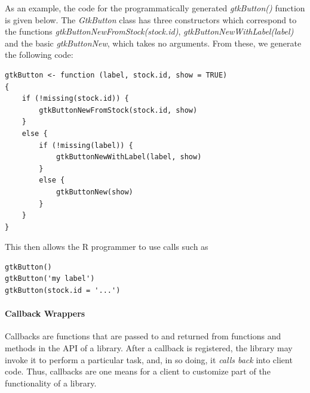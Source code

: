 \documentclass[article]{jss}
\begin{document}
As an example, the code for the programmatically generated \emph{gtkButton()} function is given below.  The \emph{GtkButton} class has three constructors which correspond to the functions \emph{gtkButtonNewFromStock(stock.id)}, \emph{gtkButtonNewWithLabel(label)} and the basic \emph{gtkButtonNew}, which takes no arguments. From these, we generate the following code:
\begin{verbatim}
gtkButton <- function (label, stock.id, show = TRUE) 
{
    if (!missing(stock.id)) {
        gtkButtonNewFromStock(stock.id, show)
    }
    else {
        if (!missing(label)) {
            gtkButtonNewWithLabel(label, show)
        }
        else {
            gtkButtonNew(show)
        }
    }
}
\end{verbatim}
This then allows the R programmer to use calls such as
\begin{verbatim}
gtkButton()
gtkButton('my label')
gtkButton(stock.id = '...')
\end{verbatim}

\paragraph{Callback Wrappers}
%



Callbacks are functions that are passed to and returned from functions and methods in the API of a library. After a callback is registered, the library may invoke it to perform a particular task, and, in so doing, it \emph{calls back} into client code. Thus, callbacks are one means for a client to customize part of the functionality of a library.
\end{document}

